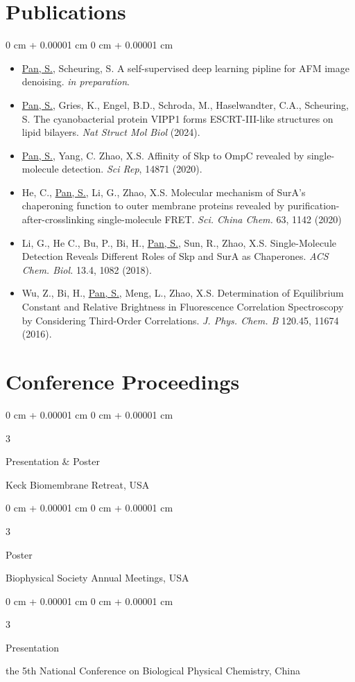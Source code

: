 \documentclass[10pt, letterpaper]{article}
\newenvironment{highlightsforbulletentries}{
        \begin{itemize}[
                topsep=0.10 cm,
                parsep=0.10 cm,
                partopsep=0pt,
                itemsep=0pt,
                leftmargin=10pt
                ]
        }{
\end{itemize}
} %
\newenvironment{onecolentry}{
        \begin{adjustwidth}{
                        0 cm + 0.00001 cm
                }{
                        0 cm + 0.00001 cm
                }
        }{
        \end{adjustwidth}
} %
\newenvironment{threecolentry}[3][]{
        \onecolentry
        \def\thirdColumn{#3}
        \setcolumnwidth{5.5 cm, \fill, 3 cm}
        \begin{paracol}{3}
                {\raggedright #2} \switchcolumn
        }{
                \switchcolumn \raggedleft \thirdColumn
        \end{paracol}
        \endonecolentry
} %
\begin{document}
\section{Publications}
\begin{samepage}
        \begin{onecolentry}
                \begin{highlightsforbulletentries}
                \item \underline{Pan, S.}, Scheuring, S. A self-supervised deep learning pipline for AFM image denoising. \textit{in preparation}.
                \item \underline{Pan, S.}, Gries, K., Engel, B.D., Schroda, M., Haselwandter, C.A., Scheuring, S. The cyanobacterial protein VIPP1 forms ESCRT-III-like structures on lipid bilayers. \textit{Nat Struct Mol Biol} (2024).
                \item \underline{Pan, S.}, Yang, C. Zhao, X.S. Affinity of Skp to OmpC revealed by single-molecule detection. \textit{Sci Rep}, 14871 (2020).
                \item He, C., \underline{Pan, S.}, Li, G., Zhao, X.S. Molecular mechanism of SurA’s chaperoning function to outer membrane proteins revealed by purification-after-crosslinking single-molecule FRET. \textit{Sci. China Chem.} 63, 1142 (2020)
                \item Li, G., He C., Bu, P., Bi, H., \underline{Pan, S.}, Sun, R., Zhao, X.S. Single-Molecule Detection Reveals Different Roles of Skp and SurA as Chaperones. \textit{ACS Chem. Biol.} 13.4, 1082 (2018).
                \item Wu, Z., Bi, H., \underline{Pan, S.}, Meng, L., Zhao, X.S. Determination of Equilibrium Constant and Relative Brightness in Fluorescence Correlation Spectroscopy by Considering Third-Order Correlations. \textit{J. Phys. Chem. B} 120.45, 11674 (2016).
                \end{highlightsforbulletentries}
        \end{onecolentry}
\end{samepage}

\section{Conference Proceedings}
\begin{threecolentry} {Presentation \& Poster} {2024}
         Keck Biomembrane Retreat, USA
\end{threecolentry}
\begin{threecolentry} {Poster} {2024}
        Biophysical Society Annual Meetings, USA
\end{threecolentry}
\begin{threecolentry} {Presentation} {2018}
        the 5th National Conference on Biological Physical Chemistry, China
\end{threecolentry}
\end{document}
